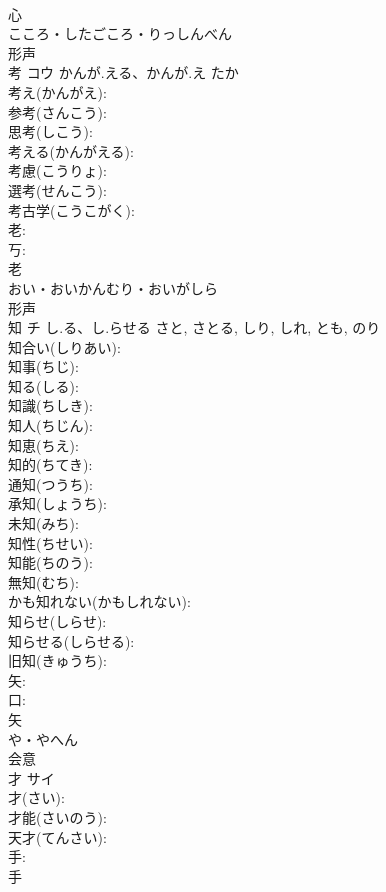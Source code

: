 \documentclass[8pt]{extreport}
\begin{document}
\begin{CJK}{UTF8}{min}
\\	心	
\\	こころ・したごころ・りっしんべん	
\\	形声 
\\	考	コウ	かんが.える、かんが.え	たか	
\\	考え(かんがえ): 
\\	参考(さんこう): 
\\	思考(しこう): 
\\	考える(かんがえる): 
\\	考慮(こうりょ): 
\\	選考(せんこう): 
\\	考古学(こうこがく): 
\\	老: 
\\	丂: 
\\	老	
\\	おい・おいかんむり・おいがしら	
\\	形声 
\\	知	チ	し.る、し.らせる	さと, さとる, しり, しれ, とも, のり	
\\	知合い(しりあい): 
\\	知事(ちじ): 
\\	知る(しる): 
\\	知識(ちしき): 
\\	知人(ちじん): 
\\	知恵(ちえ): 
\\	知的(ちてき): 
\\	通知(つうち): 
\\	承知(しょうち): 
\\	未知(みち): 
\\	知性(ちせい): 
\\	知能(ちのう): 
\\	無知(むち): 
\\	かも知れない(かもしれない): 
\\	知らせ(しらせ): 
\\	知らせる(しらせる): 
\\	旧知(きゅうち): 
\\	矢: 
\\	口: 
\\	矢	
\\	や・やへん	
\\	会意 
\\	才	サイ			
\\	才(さい): 
\\	才能(さいのう): 
\\	天才(てんさい): 
\\	手: 
\\	手	

\end{CJK}
\end{document}

